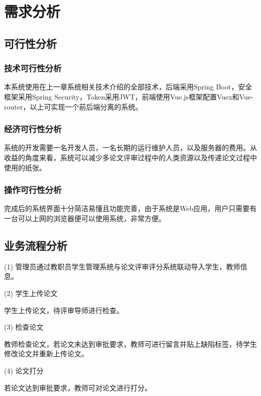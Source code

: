 
\chapter{需求分析}
\label{需求分析}

\section{可行性分析}

\subsection{技术可行性分析}

本系统使用在上一章系统相关技术介绍的全部技术，后端采用Spring Boot，安全框架采用Spring Security，Token采用JWT，前端使用Vue.js框架配置Vuex和Vue-router，以上可实现一个前后端分离的系统。

\subsection{经济可行性分析}

系统的开发需要一名开发人员，一名长期的运行维护人员，以及服务器的费用。从收益的角度来看，系统可以减少多论文评审过程中的人类资源以及传递论文过程中使用的纸张。

\subsection{操作可行性分析}

完成后的系统界面十分简洁易懂且功能完善，由于系统是Web应用，用户只需要有一台可以上网的浏览器便可以使用系统，非常方便。

\section{业务流程分析}

 (1) 管理员通过教职员学生管理系统与论文评审评分系统联动导入学生，教师信息。

(2) 学生上传论文

学生上传论文，待评审导师进行检查。

(3) 检查论文

教师检查论文，若论文未达到审批要求，教师可进行留言并贴上缺陷标签，待学生修改论文并重新上传论文。

(4) 论文打分

若论文达到审批要求，教师可对论文进行打分。

